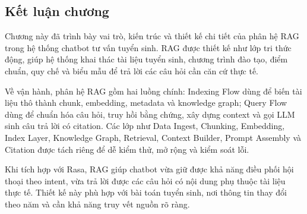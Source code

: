 \subsection{Kết luận chương}

Chương này đã trình bày vai trò, kiến trúc và thiết kế chi tiết của phân hệ RAG trong hệ thống chatbot tư vấn tuyển sinh. RAG được thiết kế như lớp tri thức động, giúp hệ thống khai thác tài liệu tuyển sinh, chương trình đào tạo, điểm chuẩn, quy chế và biểu mẫu để trả lời các câu hỏi cần căn cứ thực tế.

Về vận hành, phân hệ RAG gồm hai luồng chính: Indexing Flow dùng để biến tài liệu thô thành chunk, embedding, metadata và knowledge graph; Query Flow dùng để chuẩn hóa câu hỏi, truy hồi bằng chứng, xây dựng context và gọi LLM sinh câu trả lời có citation. Các lớp như Data Ingest, Chunking, Embedding, Index Layer, Knowledge Graph, Retrieval, Context Builder, Prompt Assembly và Citation được tách riêng để dễ kiểm thử, mở rộng và kiểm soát lỗi.

Khi tích hợp với Rasa, RAG giúp chatbot vừa giữ được khả năng điều phối hội thoại theo intent, vừa trả lời được các câu hỏi có nội dung phụ thuộc tài liệu thực tế. Thiết kế này phù hợp với bài toán tuyển sinh, nơi thông tin thay đổi theo năm và cần khả năng truy vết nguồn rõ ràng.
